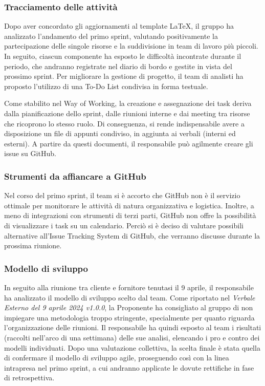 \subsubsection{Tracciamento delle attività}
\par Dopo aver concordato gli aggiornamenti al template LaTeX, il gruppo ha analizzato l'andamento del primo sprint, valutando positivamente la partecipazione delle singole risorse e la suddivisione in team di lavoro più piccoli. In seguito, ciascun componente ha esposto le difficoltà incontrate durante il periodo, che andranno registrate nel diario di bordo e gestite in vista del prossimo sprint. Per migliorare la gestione di progetto, il team di analisti ha proposto l’utilizzo di una To-Do List condivisa in forma testuale.
\par Come stabilito nel Way of Working, la creazione e assegnazione dei task deriva dalla pianificazione dello sprint, dalle riunioni interne e dai meeting tra risorse che ricoprono lo stesso ruolo. Di conseguenza, si rende indispensabile avere a disposizione un file di appunti condiviso, in aggiunta ai verbali (interni ed esterni). A partire da questi documenti, il responsabile può agilmente creare gli issue su GitHub.

\subsubsection{Strumenti da affiancare a GitHub}
\par Nel corso del primo sprint, il team si è accorto che GitHub non è il servizio ottimale per monitorare le attività di natura organizzativa e logistica. Inoltre, a meno di integrazioni con strumenti di terzi parti, GitHub non offre la possibilità di visualizzare i task su un calendario. Perciò si è deciso di valutare possibili alternative all'Issue Tracking System di GitHub, che verranno discusse durante la prossima riunione.

\subsubsection{Modello di sviluppo}
\par In seguito alla riunione tra cliente e fornitore tenutasi il 9 aprile, il responsabile ha analizzato il modello di sviluppo scelto dal team. Come riportato nel \emph{Verbale Esterno del 9 aprile 2024 v1.0.0}, la Proponente ha consigliato al gruppo di non impiegare una metodologia troppo stringente, specialmente per quanto riguarda l’organizzazione delle riunioni. Il responsabile ha quindi esposto al team i risultati (raccolti nell’arco di una settimana) delle sue analisi, elencando i pro e contro dei modelli individuati. Dopo una valutazione collettiva, la scelta finale è stata quella di confermare il modello di sviluppo agile, proseguendo così con la linea intrapresa nel primo sprint, a cui andranno applicate le dovute rettifiche in fase di retrospettiva.


